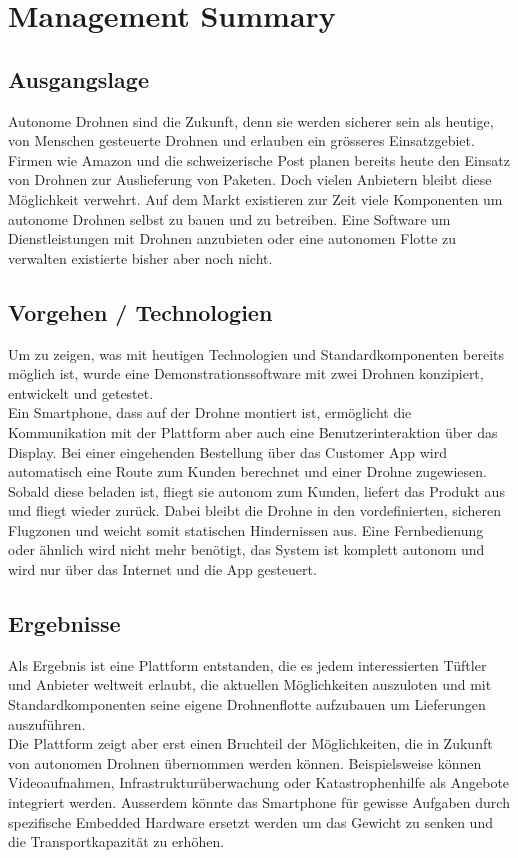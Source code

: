\newpage
{}
\chapter*{Management Summary}
\section*{Ausgangslage}
Autonome Drohnen sind die Zukunft, denn sie werden sicherer sein als heutige, von Menschen gesteuerte Drohnen und erlauben ein grösseres Einsatzgebiet. Firmen wie Amazon und die schweizerische Post planen bereits heute den Einsatz von Drohnen zur Auslieferung von Paketen. Doch vielen Anbietern bleibt diese Möglichkeit verwehrt. Auf dem Markt existieren zur Zeit viele Komponenten um autonome Drohnen selbst zu bauen und zu betreiben. Eine Software um Dienstleistungen mit Drohnen anzubieten oder eine autonomen Flotte zu verwalten existierte bisher aber noch nicht.

\section*{Vorgehen / Technologien}
Um zu zeigen, was mit heutigen Technologien und Standardkomponenten bereits möglich ist, wurde eine Demonstrationssoftware mit zwei Drohnen konzipiert, entwickelt und getestet. \\

Ein Smartphone, dass auf der Drohne montiert ist, ermöglicht die Kommunikation mit der Plattform aber auch eine Benutzerinteraktion über das Display. Bei einer eingehenden Bestellung über das Customer App wird automatisch eine Route zum Kunden berechnet und einer Drohne zugewiesen. Sobald diese beladen ist, fliegt sie autonom zum Kunden, liefert das Produkt aus und fliegt wieder zurück. Dabei bleibt die Drohne in den vordefinierten, sicheren Flugzonen und weicht somit statischen Hindernissen aus. Eine Fernbedienung oder ähnlich wird nicht mehr benötigt, das System ist komplett autonom und wird nur über das Internet und die App gesteuert.

\section*{Ergebnisse}
Als Ergebnis ist eine Plattform entstanden, die es jedem interessierten Tüftler und Anbieter weltweit erlaubt, die aktuellen Möglichkeiten auszuloten und mit Standardkomponenten seine eigene Drohnenflotte aufzubauen um Lieferungen auszuführen.
\\
Die Plattform zeigt aber erst einen Bruchteil der Möglichkeiten, die in Zukunft von autonomen Drohnen übernommen werden können. Beispielsweise können Videoaufnahmen, Infrastrukturüberwachung oder Katastrophenhilfe als Angebote integriert werden. Ausserdem könnte das Smartphone für gewisse Aufgaben durch spezifische Embedded Hardware ersetzt werden um das Gewicht zu senken und die Transportkapazität zu erhöhen. 

